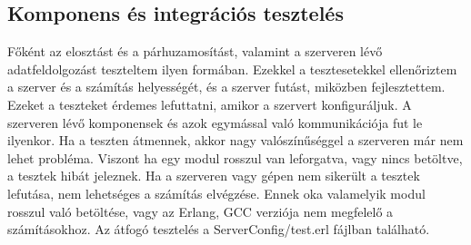 \subsection{Komponens és integrációs tesztelés}
	Főként az elosztást és a párhuzamosítást, valamint a szerveren lévő adatfeldolgozást teszteltem ilyen formában. Ezekkel a tesztesetekkel ellenőriztem a szerver és a számítás helyességét, és a szerver futást, miközben fejlesztettem.\newline
	Ezeket a teszteket érdemes lefuttatni, amikor a szervert konfiguráljuk. A szerveren lévő komponensek és azok egymással való kommunikációja fut le ilyenkor. Ha a teszten átmennek, akkor nagy valószínűséggel a szerveren már nem lehet probléma.\newline
	Viszont ha egy modul rosszul van leforgatva, vagy nincs betöltve, a tesztek hibát jeleznek. Ha a szerveren vagy gépen nem sikerült a tesztek lefutása, nem lehetséges a számítás elvégzése. Ennek oka valamelyik modul rosszul való betöltése, vagy az Erlang, GCC verziója nem megfelelő a számításokhoz.\newline
	Az átfogó tesztelés a ServerConfig/test.erl fájlban található. 

